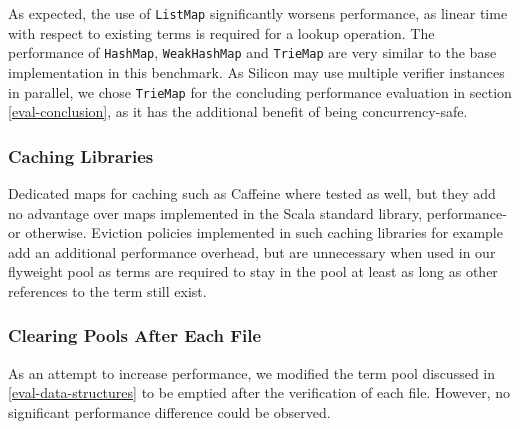 \documentclass[11pt]{article}
\begin{document}
    As expected, the use of \texttt{ListMap} significantly worsens performance,
    as linear time with respect to existing terms is required for a lookup operation.
    The performance of \texttt{HashMap}, \texttt{WeakHashMap} and \texttt{TrieMap}
    are very similar to the base implementation in this benchmark.
    As Silicon may use multiple verifier instances in parallel,
    we chose \texttt{TrieMap} for the concluding performance evaluation in section \ref{eval-conclusion}, as it has
    the additional benefit of being concurrency-safe.

    \subsubsection{Caching Libraries}

    Dedicated maps for caching such as Caffeine \cite{caffeine} where tested as well,
    but they add no advantage over maps
    implemented in the Scala standard library, performance- or otherwise.
    Eviction policies implemented in such caching libraries for example
    add an additional performance overhead, but are unnecessary when used
    in our flyweight pool as terms are required to stay in the pool at least as long
    as other references to the term still exist. 

    \subsubsection{Clearing Pools After Each File}

    As an attempt to increase performance, we modified
    the term pool discussed in \ref{eval-data-structures} to be emptied
    after the verification of each file. However, no significant
    performance difference could be observed.



    
\end{document}
